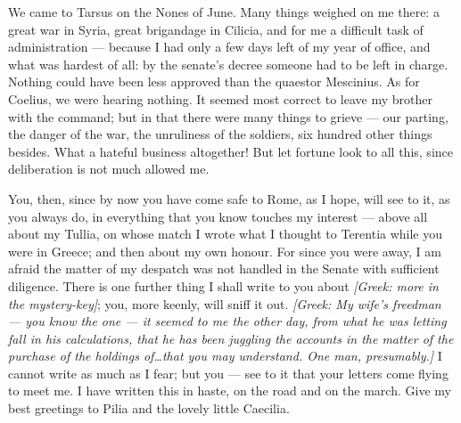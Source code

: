 

 We came to Tarsus on the Nones of June. Many things weighed on me there: a great war in Syria, great brigandage in Cilicia, and for me a difficult task of administration --- because I had only a few days left of my year of office, and what was hardest of all: by the senate's decree someone had to be left in charge. Nothing could have been less approved than the quaestor Mescinius. As for Coelius, we were hearing nothing. It seemed most correct to leave my brother with the command; but in that there were many things to grieve --- our parting, the danger of the war, the unruliness of the soldiers, six hundred other things besides. What a hateful business altogether! But let fortune look to all this, since deliberation is not much allowed me.

 You, then, since by now you have come safe to Rome, as I hope, will see to it, as you always do, in everything that you know touches my interest --- above all about my Tullia, on whose match I wrote what I thought to Terentia while you were in Greece; and then about my own honour. For since you were away, I am afraid the matter of my despatch was not handled in the Senate with sufficient diligence. There is one further thing I shall write to you about \textit{[Greek: more in the mystery-key]}; you, more keenly, will sniff it out. \textit{[Greek: My wife's freedman --- you know the one --- it seemed to me the other day, from what he was letting fall in his calculations, that he has been juggling the accounts in the matter of the purchase of the holdings of\ldots that you may understand. One man, presumably.]} I cannot write as much as I fear; but you --- see to it that your letters come flying to meet me. I have written this in haste, on the road and on the march. Give my best greetings to Pilia and the lovely little Caecilia.
